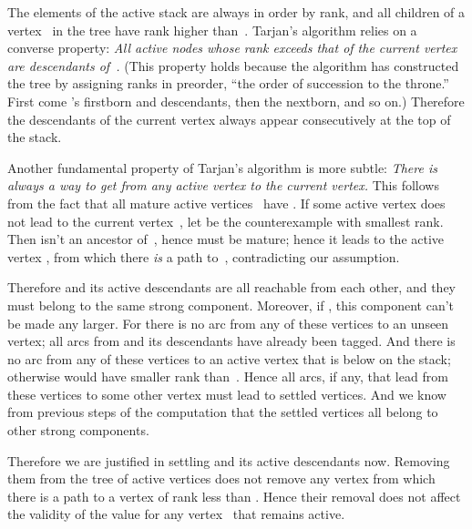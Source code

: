 The elements of the active stack are always in order
by rank, and all children of a vertex~ in the tree have rank higher
than~. Tarjan's algorithm relies on a converse property: {\sl All
active nodes whose rank exceeds that of the current vertex~ are
descendants of~.} (This property holds because the algorithm has
constructed
the tree by assigning ranks in preorder, ``the order of succession to the
throne.'' First come 's firstborn and descendants, then the nextborn,
and so on.) Therefore the descendants of the current vertex always appear
consecutively at the top of the stack.

Another fundamental property of Tarjan's algorithm is more subtle:
{\sl There is always a way to get from any active vertex to the
current vertex.} This follows from the fact that all mature active vertices~%
have .  If some active vertex
does not lead to the
current vertex~,
let  be the counterexample with smallest rank. Then  isn't an
ancestor of~, hence  must be mature; hence it leads to the
active vertex , from which there {\sl is\/} a path to~,
contradicting our assumption.

Therefore  and its active descendants are all reachable from each
other, and they must belong to the same strong component. Moreover, if
, this component can't be made any larger. For there
is no
arc from any of these vertices to an unseen vertex; all arcs from 
and its descendants have already been tagged. And there is no arc from
any of these vertices to an active vertex that is below  on the
stack; otherwise  would have smaller rank than~.
Hence all
arcs, if any, that lead from these vertices to some other vertex must
lead to settled vertices. And we know from previous steps of the
computation that the settled vertices all belong to other strong
components.

Therefore we are justified in settling  and its active descendants now.
Removing them from the tree of active vertices does not remove any
vertex from which there is a path to a vertex of rank less than .
Hence their removal does not affect the validity of the 
value
for any vertex~ that remains active.

